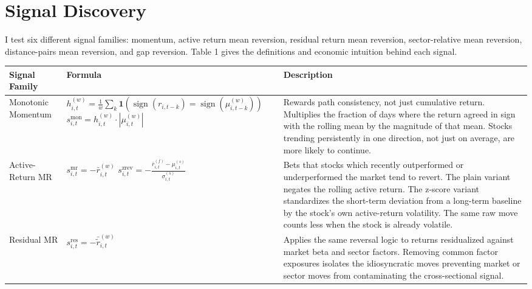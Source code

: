\section{Signal Discovery}

I test six different signal families: momentum, active return mean reversion, residual return mean reversion, sector-relative mean reversion, distance-pairs mean reversion, and gap reversion. Table 1 gives the definitions and economic intuition behind each signal.

\begin{table}[H]
    \centering
    \small
    \begin{tabular}{p{2.8cm} >{\raggedright\arraybackslash}p{4.5cm} >{\raggedright\arraybackslash}p{7cm}}
        \toprule
        Signal Family & Formula & Description \\
        \midrule
        Monotonic Momentum &
        $h^{(w)}_{i,t} = \frac{1}{w}\sum_{k} \mathbf{1}(\operatorname{sign}(r_{i,t-k}) = \operatorname{sign}(\mu^{(w)}_{i,t-k}))$ \newline\newline $s^{\mathrm{mon}}_{i,t} = h^{(w)}_{i,t} \cdot |\mu^{(w)}_{i,t}|$ &
        Rewards path consistency, not just cumulative return. Multiplies the fraction of days where the return agreed in sign with the rolling mean by the magnitude of that mean. Stocks trending persistently in one direction, not just on average, are more likely to continue. \\
        \midrule
        Active-Return MR &
        $s^{\mathrm{mr}}_{i,t} = -\bar{r}^{(w)}_{i,t}$ \newline\newline $s^{\mathrm{zrev}}_{i,t} = -\frac{\bar{r}^{(f)}_{i,t} - \mu^{(s)}_{i,t}}{\sigma^{(s)}_{i,t}}$ &
        Bets that stocks which recently outperformed or underperformed the market tend to revert. The plain variant negates the rolling active return. The z-score variant standardizes the short-term deviation from a long-term baseline by the stock's own active-return volatility. The same raw move counts less when the stock is already volatile. \\
        \midrule
        Residual MR &
        $s^{\mathrm{res}}_{i,t} = -\bar{\tilde{r}}^{(w)}_{i,t}$ &
        Applies the same reversal logic to returns residualized against market beta and sector factors. Removing common factor exposures isolates the idiosyncratic moves preventing market or sector moves from contaminating the cross-sectional signal. \\

\end{tabular}
\end{table}
